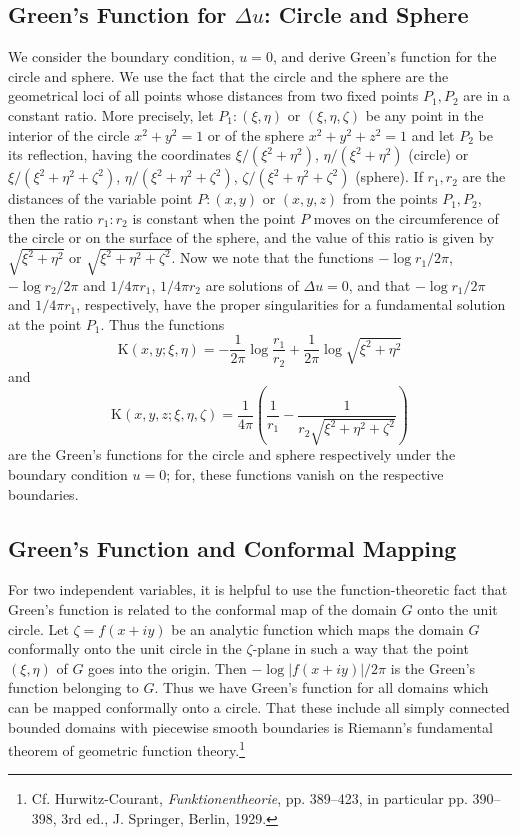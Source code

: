 \subsection{Green's Function for $\Delta u$: Circle and Sphere}
We consider the boundary condition, $u=0$, and derive Green's function for the circle and sphere. We use the fact that the circle and the sphere are the geometrical loci of all points whose distances from two fixed points $P_1,P_2$ are in a constant ratio. More precisely, let $P_1:(\xi,\eta)$ or $(\xi,\eta,\zeta)$ be any point in the interior of the circle $x^2+y^2=1$ or of the sphere $x^2+y^2+z^2=1$ and let $P_2$ be its reflection, having the coordinates $\xi/(\xi^2+\eta^2)$, $\eta/(\xi^2+\eta^2)$ (circle) or $\xi/(\xi^2+\eta^2+\zeta^2)$, $\eta/(\xi^2+\eta^2+\zeta^2)$, $\zeta/(\xi^2+\eta^2+\zeta^2)$ (sphere). If $r_1,r_2$ are the distances of the variable point $P:(x,y)$ or $(x,y,z)$ from the points $P_1,P_2$, then the ratio $r_1:r_2$ is constant when the point $P$ moves on the circumference of the circle or on the surface of the sphere, and the value of this ratio is given by $\sqrt{\xi^2+\eta^2}$ or $\sqrt{\xi^2+\eta^2+\zeta^2}$. Now we note that the functions $-\log r_1/2\pi$, $-\log r_2/2\pi$ and $1/4\pi r_1$, $1/4\pi r_2$ are solutions of $\Delta u=0$, and that $-\log r_1/2\pi$ and $1/4\pi r_1$, respectively, have the proper singularities for a fundamental solution at the point $P_1$. Thus the functions
\[
\mathrm K(x,y;\xi,\eta)=-\frac1{2\pi}\log\frac{r_1}{r_2}+\frac1{2\pi}\log\sqrt{\xi^2+\eta^2}
\]
and
\[
\mathrm K(x,y,z;\xi,\eta,\zeta)=\frac1{4\pi}\left(\frac1{r_1}-\frac1{r_2\sqrt{\xi^2+\eta^2+\zeta^2}}\right)
\]
are the Green's functions for the circle and sphere respectively under the boundary condition $u=0$; for, these functions vanish on the respective boundaries.

\subsection{Green's Function and Conformal Mapping}
For two independent variables, it is helpful to use the function-theoretic fact that Green's function is related to the conformal map of the domain $G$ onto the unit circle. Let $\zeta=f(x+iy)$ be an analytic function which maps the domain $G$ conformally onto the unit circle in the $\zeta$-plane in such a way that the point $(\xi,\eta)$ of $G$ goes into the origin. Then $-\log|f(x+iy)|/2\pi$ is the Green's function belonging to $G$. Thus we have Green's function for all domains which can be mapped conformally onto a circle. That these include all simply connected bounded domains with piecewise smooth boundaries is Riemann's fundamental theorem of geometric function theory.\footnote{Cf. Hurwitz-Courant, \emph{Funktionentheorie}, pp. 389--423, in particular pp. 390--398, 3rd ed., J. Springer, Berlin, 1929.}

